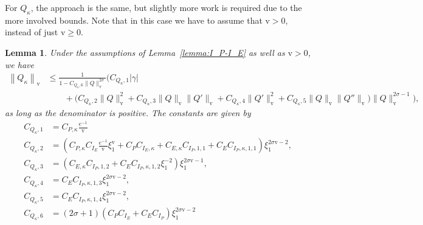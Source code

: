 \documentclass[11pt]{article}
\newcommand{\normv}{\mathrm{v}}
\newtheorem{lemma}[definition]{Lemma}
\begin{document}
For \(Q_{\kappa}\), the approach is the same, but slightly more work
is required due to the more involved bounds. Note that in this case
we have to assume that \(\normv > 0\), instead of just
\(\normv \geq 0\).
\begin{lemma}\label{lemma:norm-Q-dkappa}
  Under the assumptions of Lemma~\ref{lemma:I_P-I_E} as well as
  \(\normv > 0\), we have
  \begin{align*}
    \left\|Q_{\kappa}\right\|_{\normv}
    &\leq \frac{1}{
      1
      - C_{Q_{\kappa},6}\|Q\|_{\normv}^{2\sigma}
      }\Big(
      C_{Q_{\kappa},1}|\gamma|\\
    &\qquad+ \Big(
      C_{Q_{\kappa},2}\|Q\|_{\normv}^{2}
      + C_{Q_{\kappa},3}\|Q\|_{\normv}\|Q'\|_{\normv}
      + C_{Q_{\kappa},4}\|Q'\|_{\normv}^{2}
      + C_{Q_{\kappa},5}\|Q\|_{\normv}\|Q''\|_{\normv}
      \Big)\|Q\|_{\normv}^{2\sigma - 1}
      \Big),
  \end{align*}
  as long as the denominator is positive. The constants are given by
  \begin{align*}
    C_{Q_{\kappa},1}
    &= C_{P,\kappa}\frac{e^{-1}}{\normv}\\
    C_{Q_{\kappa},2}
    &= \left(
      C_{P,\kappa}C_{I_{E}}\frac{e^{-1}}{\normv}\xi_{1}^{\normv}
    + C_{P}C_{I_{E},\kappa}
    + C_{E,\kappa}C_{I_{P},1,1}
    + C_{E}C_{I_{P},\kappa,1,1}\right)\xi_{1}^{2\sigma\normv - 2},\\
    C_{Q_{\kappa},3}
    &= (C_{E,\kappa}C_{I_{P},1,2}
      + C_{E}C_{I_{P},\kappa,1,2}\xi_{1}^{-2}
      )\xi_{1}^{2\sigma\normv - 1},\\
    C_{Q_{\kappa},4}
    &= C_{E}C_{I_{P},\kappa,1,3}\xi_{1}^{2\sigma\normv - 2},\\
    C_{Q_{\kappa},5}
    &= C_{E}C_{I_{P},\kappa,1,4}\xi_{1}^{2\sigma\normv - 2},\\
    C_{Q_{\kappa},6}
    &= (2\sigma + 1)(
      C_{P}C_{I_{E}}
      + C_{E}C_{I_{P}}
      )\xi_{1}^{2\sigma\normv - 2}
  \end{align*}
\end{lemma}
\end{document}
